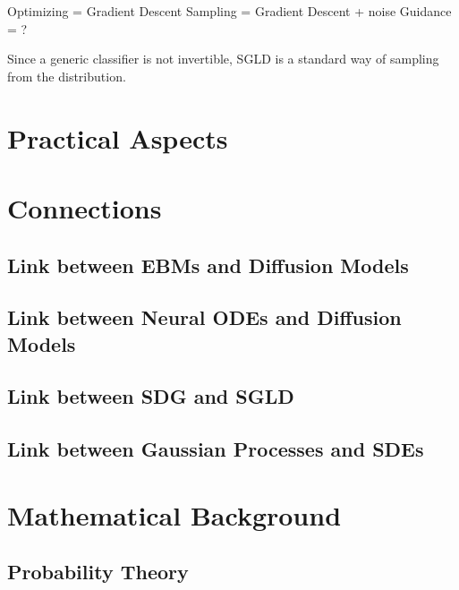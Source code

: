 \documentclass[a4paper, 11pt]{article}
\begin{document}
Optimizing = Gradient Descent
Sampling = Gradient Descent + noise
Guidance = ?

Since a generic classifier is not invertible, SGLD is a standard way of sampling from the distribution.

\section{Practical Aspects}

\section{Connections}
\subsection{Link between EBMs and Diffusion Models}
\subsection{Link between Neural ODEs and Diffusion Models}
\subsection{Link between SDG and SGLD}
\subsection{Link between Gaussian Processes and SDEs}

\appendix
\section{Mathematical Background}
\subsection{Probability Theory}


 

\end{document}
